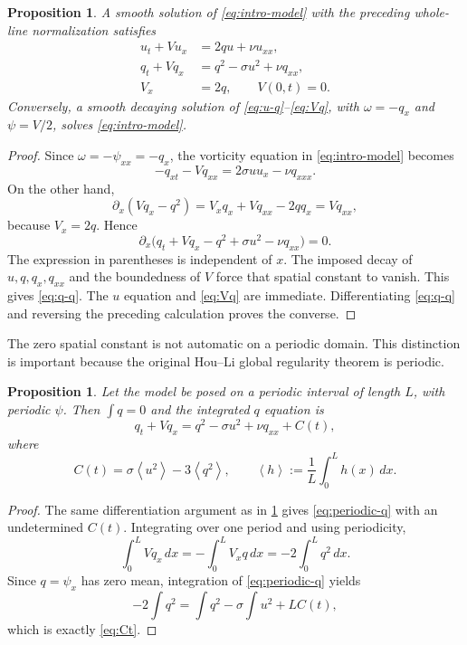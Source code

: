 \documentclass[11pt]{article}
\newtheorem{proposition}[theorem]{Proposition}
\theoremstyle{definition}
\newcommand{\avg}[1]{\left\langle #1\right\rangle}
\begin{document}
\begin{proposition}\label{prop:qsystem}
A smooth solution of \eqref{eq:intro-model} with the preceding whole-line normalization satisfies
\begin{align}
 u_t+Vu_x&=2qu+\nu u_{xx},\label{eq:u-q}\\
 q_t+Vq_x&=q^2-\sigma u^2+\nu q_{xx},\label{eq:q-q}\\
 V_x&=2q,\qquad V(0,t)=0.\label{eq:Vq}
\end{align}
Conversely, a smooth decaying solution of \eqref{eq:u-q}--\eqref{eq:Vq}, with $\omega=-q_x$ and $\psi=V/2$, solves \eqref{eq:intro-model}.
\end{proposition}

\begin{proof}
Since $\omega=-\psi_{xx}=-q_x$, the vorticity equation in \eqref{eq:intro-model} becomes
\[
 -q_{xt}-Vq_{xx}=2\sigma uu_x-\nu q_{xxx}.
\]
On the other hand,
\[
 \partial_x(Vq_x-q^2)
 =V_xq_x+Vq_{xx}-2qq_x
 =Vq_{xx},
\]
because $V_x=2q$.  Hence
\[
 \partial_x\bigl(q_t+Vq_x-q^2+\sigma u^2-\nu q_{xx}\bigr)=0.
\]
The expression in parentheses is independent of $x$.  The imposed decay of $u,q,q_x,q_{xx}$ and the boundedness of $V$ force that spatial constant to vanish.  This gives \eqref{eq:q-q}.  The $u$ equation and \eqref{eq:Vq} are immediate.  Differentiating \eqref{eq:q-q} and reversing the preceding calculation proves the converse.
\end{proof}

The zero spatial constant is not automatic on a periodic domain.  This distinction is important because the original Hou--Li global regularity theorem is periodic.

\begin{proposition}\label{prop:periodic}
Let the model be posed on a periodic interval of length $L$, with periodic $\psi$.  Then $\int q=0$ and the integrated $q$ equation is
\begin{equation}\label{eq:periodic-q}
 q_t+Vq_x=q^2-\sigma u^2+\nu q_{xx}+C(t),
\end{equation}
where
\begin{equation}\label{eq:Ct}
 C(t)=\sigma\avg{u^2}-3\avg{q^2},
 \qquad
 \avg{h}:=\frac1L\int_0^L h(x)\,dx.
\end{equation}
\end{proposition}

\begin{proof}
The same differentiation argument as in \cref{prop:qsystem} gives \eqref{eq:periodic-q} with an undetermined $C(t)$.  Integrating over one period and using periodicity,
\[
 \int_0^L Vq_x\,dx=-\int_0^L V_xq\,dx=-2\int_0^Lq^2\,dx.
\]
Since $q=\psi_x$ has zero mean, integration of \eqref{eq:periodic-q} yields
\[
 -2\int q^2=\int q^2-\sigma\int u^2+LC(t),
\]
which is exactly \eqref{eq:Ct}.
\end{proof}
\end{document}
